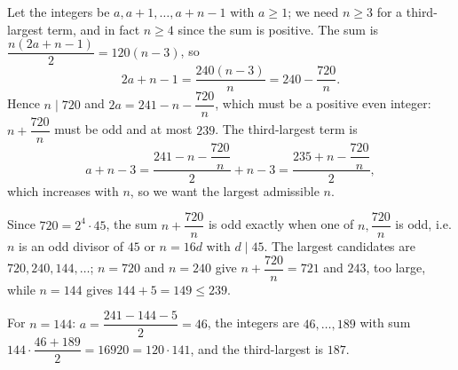 Let the integers be $a,a+1,\dots,a+n-1$ with $a\ge1$; we need $n\ge3$ for a third-largest term, and in fact $n\ge4$ since the sum is positive. The sum is $\dfrac{n(2a+n-1)}{2}=120(n-3)$, so
\[2a+n-1=\dfrac{240(n-3)}{n}=240-\dfrac{720}{n}.\]
Hence $n\mid720$ and $2a=241-n-\dfrac{720}{n}$, which must be a positive even integer: $n+\dfrac{720}{n}$ must be odd and at most $239$. The third-largest term is
\[a+n-3=\dfrac{241-n-\dfrac{720}{n}}{2}+n-3=\dfrac{235+n-\dfrac{720}{n}}{2},\]
which increases with $n$, so we want the largest admissible $n$.

Since $720=2^4\cdot45$, the sum $n+\dfrac{720}{n}$ is odd exactly when one of $n,\dfrac{720}{n}$ is odd, i.e. $n$ is an odd divisor of $45$ or $n=16d$ with $d\mid45$. The largest candidates are $720,240,144,\dots$; $n=720$ and $n=240$ give $n+\dfrac{720}{n}=721$ and $243$, too large, while $n=144$ gives $144+5=149\le239$.

For $n=144$: $a=\dfrac{241-144-5}{2}=46$, the integers are $46,\dots,189$ with sum $144\cdot\dfrac{46+189}{2}=16920=120\cdot141$, and the third-largest is $\boxed{187}$.
